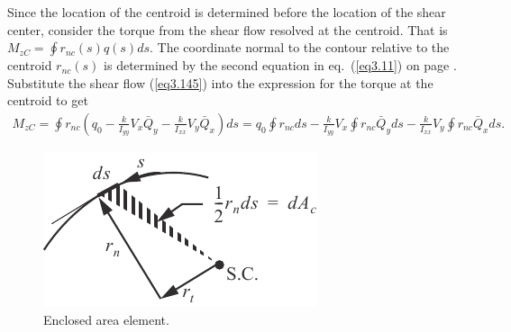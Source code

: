 \documentclass{AeroStructure-ERJohnson}
\begin{document}
Since the location of the centroid is determined before the location of the shear center, consider the torque from the shear flow resolved at the centroid. That is $M_{z C}=\oint r_{n c}(s) q(s) d s$. The coordinate normal to the contour relative to the centroid $r_{n c}(s)$ is determined by the second equation in eq.~(\ref{eq3.11}) on page \pageref{eq3.11}. Substitute the shear flow (\ref{eq3.145}) into the expression for the torque at the centroid to get
\begin{align}\label{eq3.147}
M_{z C}=\oint r_{n c}\left(q_{0}-\frac{k}{I_{y y}} V_{x} \bar{Q}_{y}-\frac{k}{I_{x x}} V_{y} \bar{Q}_{x}\right) d s=q_{0} \oint r_{n c} d s-\frac{k}{I_{y y}} V_{x} \oint r_{n c} \bar{Q}_{y} d s-\frac{k}{I_{x x}} V_{y} \oint r_{n c} \bar{Q}_{x} d s.
\end{align}


\begin{figure}
\includegraphics{Figure_3-22.pdf}
\caption{Enclosed area element.\label{fig3.22}}
\end{figure}
\end{document}
